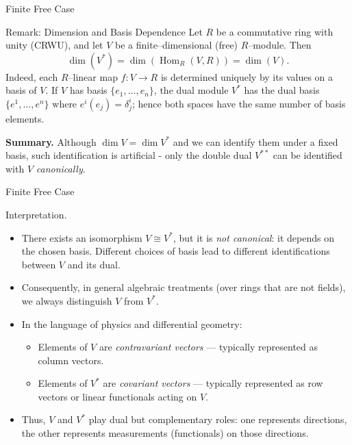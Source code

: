 \begin{frame}{Finite Free Case}

\begin{block}{Remark: Dimension and Basis Dependence}
Let $R$ be a commutative ring with unity (CRWU), and let $V$ be a finite--dimensional (free) $R$--module.
Then
\[
\dim(V^*) = \dim\left(\operatorname{Hom}_R(V, R)\right) = \dim(V).
\]
Indeed, each $R$--linear map $f:V\to R$ is determined uniquely by its values on a basis of $V$.
If $V$ has basis $\{e_1,\dots,e_n\}$, the dual module $V^*$ has the dual basis $\{e^1,\dots,e^n\}$ where $e^i(e_j)=\delta^i_j$; hence both spaces have the same number of basis elements.
\end{block}
\textbf{Summary.}
Although $\dim V = \dim V^*$ and we can identify them under a fixed basis, such identification is artificial - only the double dual $V^{**}$ can be identified with $V$ \emph{canonically}.
\end{frame}

\begin{frame}{Finite Free Case}
\vspace{-0.2cm}
\begin{block}{Interpretation.}
\begin{itemize}
  \item There exists an isomorphism $V\cong V^*$, but it is \emph{not canonical}: it depends on the chosen basis. Different choices of basis lead to different identifications between $V$ and its dual.
  \item Consequently, in general algebraic treatments (over rings that are not fields), we always distinguish $V$ from $V^*$.
  \item In the language of physics and differential geometry:
  \begin{itemize}
    \item Elements of $V$ are \emph{contravariant vectors} — typically represented as column vectors.
    \item Elements of $V^*$ are \emph{covariant vectors} — typically represented as row vectors or linear functionals acting on $V$.
  \end{itemize}
  \item Thus, $V$ and $V^*$ play dual but complementary roles: one represents directions, the other represents measurements (functionals) on those directions.
\end{itemize}
\end{block}

\end{frame}

